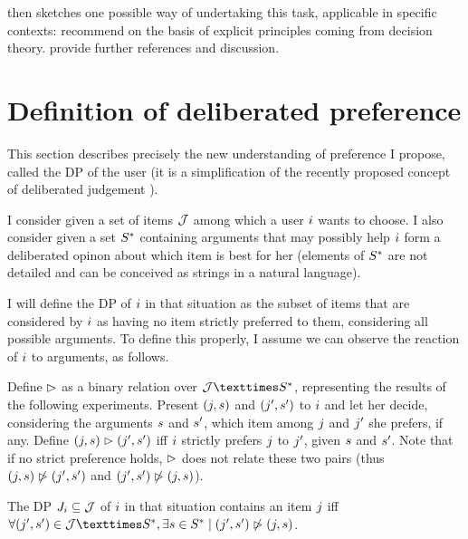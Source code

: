 \documentclass[french, english]{da2pl2018}
\begin{document}
 then sketches one possible way of undertaking this task, applicable in specific contexts: recommend on the basis of explicit principles coming from decision theory.  provide further references and discussion.

\section{Definition of deliberated preference}
\label{sec:def}
This section describes precisely the new understanding of preference I propose, called the \ac{DP} of the user (it is a simplification of the recently proposed concept of deliberated judgement \citep{cailloux_formal_2018}).

I consider given a set of items $\mathcal{J}$ among which a user $i$ wants to choose. I also consider given a set $S^*$ containing arguments that may possibly help $i$ form a deliberated opinon about which item is best for her (elements of $S^*$ are not detailed and can be conceived as strings in a natural language). 

I will define the \ac{DP} of $i$ in that situation as the subset of items that are considered by $i$ as having no item strictly preferred to them, considering all possible arguments. To define this properly, I assume we can observe the reaction of $i$ to arguments, as follows. 

Define $\vartriangleright$ as a binary relation over $\allitems × \allargs$, representing the results of the following experiments. Present $(j, s)$ and $(j', s')$ to $i$ and let her decide, considering the arguments $s$ and $s'$, which item among $j$ and $j'$ she prefers, if any. 
Define $(j, s) \vartriangleright (j', s')$ iff $i$ strictly prefers $j$ to $j'$, given $s$ and $s'$. Note that if no strict preference holds, $\vartriangleright$ does not relate these two pairs (thus $(j, s) \not\vartriangleright (j', s')$ and $(j', s') \not\vartriangleright (j, s)$). 

The \ac{DP} $J_i \subseteq \mathcal{J}$ of $i$ in that situation contains an item $j$ iff $\forall (\itm', \ar') \in \allitems × \allargs, \exists \ar \in \allargs \suchthat (\itm', \ar') \nibeats (\itm, \ar)$.
\end{document}
